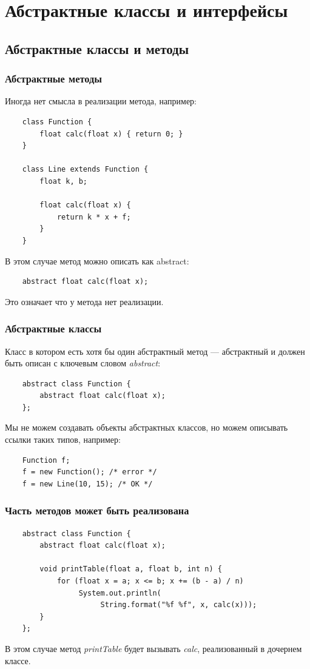 \section{Абстрактные классы и интерфейсы}

\subsection{Абстрактные классы и методы}

\begin{frame}[fragile]
	\frametitle{Абстрактные методы}

	Иногда нет смысла в реализации метода, например:
	\begin{verbatim}
	class Function {
	    float calc(float x) { return 0; }
	}

	class Line extends Function {
	    float k, b;

	    float calc(float x) {
	        return k * x + f;
	    }
	}
	\end{verbatim}
	В этом случае метод можно описать как abstract:
	\begin{verbatim}
	abstract float calc(float x);
	\end{verbatim}
	Это означает что у метода нет реализации.

\end{frame}


\begin{frame}[fragile]
	\frametitle{Абстрактные классы}
	\begin{large}
	Класс в котором есть хотя бы один абстрактный метод --- абстрактный и должен быть описан с ключевым словом \emph{abstract}:

	\begin{verbatim}
	abstract class Function {
	    abstract float calc(float x);
	};
	\end{verbatim}

	Мы не можем создавать объекты абстрактных классов, но можем описывать ссылки таких типов, например:
	\begin{verbatim}
	Function f;
	f = new Function(); /* error */
	f = new Line(10, 15); /* OK */
	\end{verbatim}
	\end{large}
\end{frame}

\begin{frame}[fragile]
	\frametitle{Часть методов может быть реализована}

	\begin{verbatim}
	abstract class Function {
	    abstract float calc(float x);

	    void printTable(float a, float b, int n) {
	        for (float x = a; x <= b; x += (b - a) / n)
	             System.out.println(
	                  String.format("%f %f", x, calc(x)));
	    }
	};
	\end{verbatim}

	В этом случае метод \emph{printTable} будет вызывать \emph{calc}, реализованный в дочернем классе.
\end{frame}

